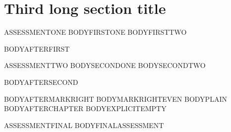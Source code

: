 \documentclass[11pt,twoside,openright]{book}
\newif\ifFixtureProbeMarks
\begin{document}
\section[THIRDSECTION]{Third long section title}
\begin{Assessment}{ASSESSMENTONE}
BODYFIRSTONE
\newpage
BODYFIRSTTWO
\end{Assessment}
BODYAFTERFIRST
\clearpage
\begin{Assessment}{ASSESSMENTTWO}
BODYSECONDONE
\newpage
BODYSECONDTWO
\end{Assessment}
BODYAFTERSECOND
\clearpage
BODYAFTERMARKRIGHT
\clearpage
BODYMARKRIGHTEVEN
\clearpage
\FixtureProbeMarksfalse
\thispagestyle{plain}
BODYPLAIN
\clearpage
\cleardoublepage
{}
\FixtureProbeMarkstrue
{}
BODYAFTERCHAPTER
\clearpage
\FixtureProbeMarksfalse
\thispagestyle{empty}
BODYEXPLICITEMPTY
\par\vspace{8mm}
\noindent{\BookHeaderTitleFont\BookHeaderIcon}
\par{}
\par{}
\FixtureProbeMarkstrue
\begin{Assessment}{ASSESSMENTFINAL}
BODYFINALASSESSMENT
\end{Assessment}
\end{document}

